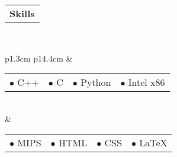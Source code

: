 \documentclass[a4paper,12pt]{extarticle}
\begin{document}
 \raggedright{\begin{tabular}[b]{p{5.5cm}}
	\bf{\Large{Skills}} \\
    \cline{1-1}
\end{tabular}} \\ \smallskip \smallskip \smallskip \smallskip
\begin{tabular}[b]{p{1.3cm} p{14.4cm}}
	&\begin{tabular}[b]{p{2.8cm} p{2.8cm} p{2.8cm} p{2.8cm}}
    $\bullet$ C++ & $\bullet$ C & $\bullet$ Python & $\bullet$ Intel x86
    \end{tabular} \medskip \\
    &\begin{tabular}[b]{p{2.8cm} p{2.8cm} p{2.8cm} p{2.8cm}}
    $\bullet$ MIPS & $\bullet$ HTML & $\bullet$ CSS & $\bullet$ \LaTeX
    \end{tabular} \\
\end{tabular}
\end{document}
